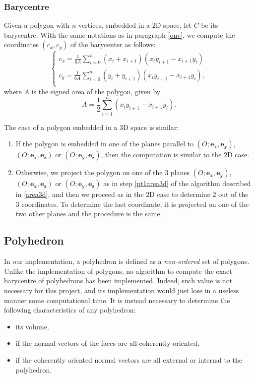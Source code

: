 \subsubsection{Barycentre}
Given a polygon with $n$ vertices, embedded in a $2$D space, let $C$ be its barycentre. With the same notations as in paragraph \ref{onv}, we compute the coordinates $(c_x,c_y)$ of the barycenter as follows:
$$
\begin{cases}
c_x=\frac{1}{6A}\sum_{i=0}^{n} (x_i+x_{i+1})(x_iy_{i+1}-x_{i+1}y_i) \\
c_y=\frac{1}{6A}\sum_{i=0}^{n} (y_i+y_{i+1})(x_iy_{i+1}-x_{i+1}y_i), \\
\end{cases}
$$
where $A$ is the signed area of the polygon, given by
$$A=\frac{1}{2} \sum_{i=1}^n (x_iy_{i+1}-x_{i+1}y_i). $$

\noindent The case of a polygon embedded in a $3$D space is similar:
\begin{enumerate}
\item If the polygon is embedded in one of the planes parallel to $(O;\mathbf{e_x},\mathbf{e_y})$, $(O;\mathbf{e_x},\mathbf{e_z})$ or $(O;\mathbf{e_y},\mathbf{e_z})$, then the computation is similar to the $2$D case. 
\item Otherwise, we project the polygon on one of the $3$ planes $(O;\mathbf{e_x},\mathbf{e_y})$, $(O;\mathbf{e_x},\mathbf{e_z})$ or $(O;\mathbf{e_y},\mathbf{e_z})$ as in step \ref{pt1area3d} of the algorithm described in \ref{area3d}, and then we proceed as in the $2$D case to determine $2$ out of the $3$ coordinates. To determine the last coordinate, it is projected on one of the two other planes and the procedure is the same. 
\end{enumerate}

\subsection{Polyhedron} \label{polyhedron}
In our implementation, a polyhedron is defined as a \textit{non-ordered} set of polygons. Unlike the implementation of polygons, no algorithm to compute the exact barycentre of polyhedrons has been implemented. Indeed, such value is not necessary for this project, and its implementation would just lose in a useless manner some computational time. It is instead necessary to determine the following characteristics of any polyhedron:
\begin{itemize}
\item its volume, 
\item if the normal vectors of the faces are all coherently oriented, 
\item if the coherently oriented normal vectors are all external or internal to the polyhedron. 
\end{itemize}


